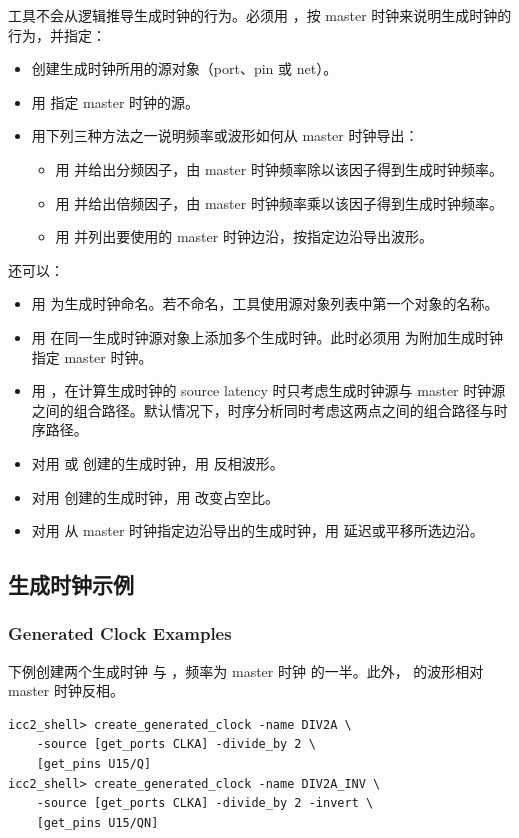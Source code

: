工具不会从逻辑推导生成时钟的行为。必须用 ，按 master 时钟来说明生成时钟的行为，并指定：
\begin{itemize}
  \item 创建生成时钟所用的源对象（port、pin 或 net）。
  \item 用  指定 master 时钟的源。
  \item 用下列三种方法之一说明频率或波形如何从 master 时钟导出：
  \begin{itemize}
    \item 用  并给出分频因子，由 master 时钟频率除以该因子得到生成时钟频率。
    \item 用  并给出倍频因子，由 master 时钟频率乘以该因子得到生成时钟频率。
    \item 用  并列出要使用的 master 时钟边沿，按指定边沿导出波形。
  \end{itemize}
\end{itemize}

还可以：
\begin{itemize}
  \item 用  为生成时钟命名。若不命名，工具使用源对象列表中第一个对象的名称。
  \item 用  在同一生成时钟源对象上添加多个生成时钟。此时必须用  为附加生成时钟指定 master 时钟。
  \item 用 ，在计算生成时钟的 source latency 时只考虑生成时钟源与 master 时钟源之间的组合路径。默认情况下，时序分析同时考虑这两点之间的组合路径与时序路径。
  \item 对用  或  创建的生成时钟，用  反相波形。
  \item 对用  创建的生成时钟，用  改变占空比。
  \item 对用  从 master 时钟指定边沿导出的生成时钟，用  延迟或平移所选边沿。
\end{itemize}

\subsection{生成时钟示例}
\subsubsection*{Generated Clock Examples}

下例创建两个生成时钟  与 ，频率为 master 时钟  的一半。此外， 的波形相对 master 时钟反相。
\begin{lstlisting}
icc2_shell> create_generated_clock -name DIV2A \
    -source [get_ports CLKA] -divide_by 2 \
    [get_pins U15/Q]
icc2_shell> create_generated_clock -name DIV2A_INV \
    -source [get_ports CLKA] -divide_by 2 -invert \
    [get_pins U15/QN]
\end{lstlisting}

